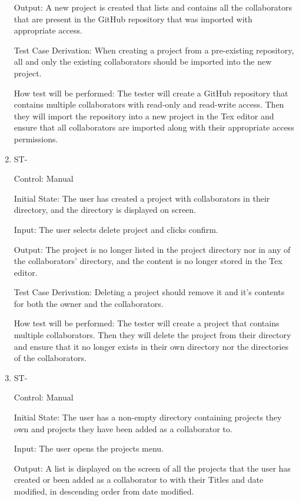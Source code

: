 \documentclass[12pt, titlepage]{article}
\newcounter{TESTID}
\newcommand\TESTNUM{\stepcounter{TESTID}\theTESTID}
\begin{document}
\begin{enumerate}
		Output: A new project is created that lists and contains all the collaborators that are present in the GitHub repository that was imported with appropriate access.
		
		Test Case Derivation: When creating a project from a pre-existing repository, all and only the existing collaborators should be imported into the new project.
		
		How test will be performed: The tester will create a GitHub repository that contains multiple collaborators with read-only and read-write access. Then they will import the repository into a new project in the Tex editor and ensure that all collaborators are imported along with their appropriate access permissions.
		
		\item{ST-\TESTNUM\\}
		
		Control: Manual
		
		Initial State: The user has created a project with collaborators in their directory, and the directory is displayed on screen.
		
		Input: The user selects delete project and clicks confirm.
		
		Output: The project is no longer listed in the project directory nor in any of the collaborators' directory, and the content is no longer stored in the Tex editor.
		
		Test Case Derivation: Deleting a project should remove it and it's contents for both the owner and the collaborators.
		
		How test will be performed: The tester will create a project that contains multiple collaborators. Then they will delete the project from their directory and ensure that it no longer exists in their own directory nor the directories of the collaborators.
		
		\item{ST-\TESTNUM\\}
		
		Control: Manual
		
		Initial State: The user has a non-empty directory containing projects they own and projects they have been added as a collaborator to.
		
		Input: The user opens the projects menu. 
		
		Output: A list is displayed on the screen of all the projects that the user has created or been added as a collaborator to with their Titles and date modified, in descending order from date modified.
		

\end{enumerate}
\end{document}
